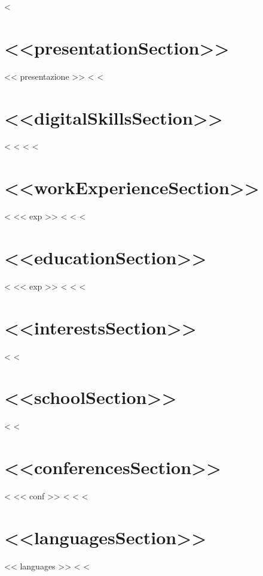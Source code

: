 \documentclass[10pt,a4paper,sans]{moderncv}
\begin{document}
\makecvtitle

<%

\section{<<presentationSection>>}
<< presentazione >>
<%
<%

\section{<<digitalSkillsSection>>}
 <%
 <%
<%
<%

\section{<<workExperienceSection>>}
 <%
 << exp >>
 <%
<%
<%

\section{<<educationSection>>}
 <%
 << exp >>
 <%
<%
<%

\section{<<interestsSection>>}
<%
<%

\section{<<schoolSection>>}
<%
<%

\section{<<conferencesSection>>}
 
 <%
 << conf >>
 <%
<%
<%

\section{<<languagesSection>>}

<< languages >>
<%
<%
\end{document}

